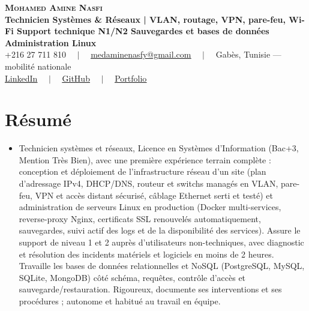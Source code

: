 \documentclass[letterpaper,9pt]{article}
\begin{document}
\begin{center}
    \textbf{\Huge \scshape \color{navy} Mohamed Amine Nasfi} \\[3pt]
    \small \textbf{\color{accent} Technicien Systèmes \& Réseaux | VLAN, routage, VPN, pare-feu, Wi-Fi \textperiodcentered{} Support technique N1/N2 \textperiodcentered{} Sauvegardes et bases de données \textperiodcentered{} Administration Linux} \\[3pt]
    \footnotesize \color{greytext}
    +216 27 711 810 $\quad|\quad$
    \href{mailto:medaminenasfy@gmail.com}{\underline{medaminenasfy@gmail.com}} $\quad|\quad$
    Gabès, Tunisie — mobilité nationale \\[2pt]
    \href{https://www.linkedin.com/in/mohamed-amine-nasfi/}{\underline{LinkedIn}} $\quad|\quad$ \href{https://github.com/medaminenasfi}{\underline{GitHub}} $\quad|\quad$ \href{https://mohamedamine-portfolio.onrender.com}{\underline{Portfolio}}
\end{center}
\vspace{-5pt}

\section{Résumé}
\begin{itemize}[leftmargin=0.18in, label={}, itemsep=1.2pt, topsep=1.5pt, parsep=0pt]
\item \footnotesize{Technicien systèmes et réseaux, Licence en Systèmes d'Information (Bac+3, Mention Très Bien), avec une première expérience terrain complète : conception et déploiement de l'infrastructure réseau d'un site (plan d'adressage IPv4, DHCP/DNS, routeur et switchs managés en VLAN, pare-feu, VPN et accès distant sécurisé, câblage Ethernet serti et testé) et administration de serveurs Linux en production (Docker multi-services, reverse-proxy Nginx, certificats SSL renouvelés automatiquement, sauvegardes, suivi actif des logs et de la disponibilité des services). Assure le support de niveau 1 et 2 auprès d'utilisateurs non-techniques, avec diagnostic et résolution des incidents matériels et logiciels en moins de 2 heures. Travaille les bases de données relationnelles et NoSQL (PostgreSQL, MySQL, SQLite, MongoDB) côté schéma, requêtes, contrôle d'accès et sauvegarde/restauration. Rigoureux, documente ses interventions et ses procédures ; autonome et habitué au travail en équipe.}
\end{itemize}\vspace{-3pt}
\end{document}
